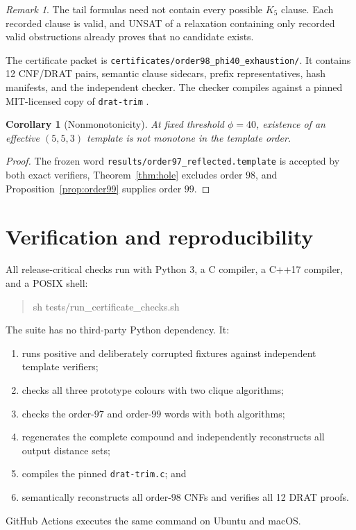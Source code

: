 \documentclass[11pt]{article}
\newtheorem{corollary}[theorem]{Corollary}
\theoremstyle{definition}
\theoremstyle{remark}
\newtheorem{remark}[theorem]{Remark}
\newcommand{\code}[1]{\texttt{#1}}
\begin{document}
\begin{remark}
The tail formulas need not contain every possible $K_5$ clause. Each recorded
clause is valid, and UNSAT of a relaxation containing only recorded valid
obstructions already proves that no candidate exists.
\end{remark}

The certificate packet is
\code{certificates/order98\_phi40\_exhaustion/}. It contains 12 CNF/DRAT
pairs, semantic clause sidecars, prefix representatives, hash manifests, and
the independent checker. The checker compiles against a pinned
MIT-licensed copy of \code{drat-trim} \cite{drat-trim}.

\begin{corollary}[Nonmonotonicity]
\label{cor:nonmonotone}
At fixed threshold $\phi=40$, existence of an effective $(5,5,3)$ template
is not monotone in the template order.
\end{corollary}

\begin{proof}
The frozen word \code{results/order97\_reflected.template} is accepted by
both exact verifiers, Theorem~\ref{thm:hole} excludes order $98$, and
Proposition~\ref{prop:order99} supplies order $99$.
\end{proof}

\section{Verification and reproducibility}

All release-critical checks run with Python 3, a C compiler, a C++17
compiler, and a POSIX shell:
\begin{quote}
\ttfamily\small
sh tests/run\_certificate\_checks.sh
\end{quote}
The suite has no third-party Python dependency. It:
\begin{enumerate}
  \item runs positive and deliberately corrupted fixtures against independent
  template verifiers;
  \item checks all three prototype colours with two clique algorithms;
  \item checks the order-$97$ and order-$99$ words with both algorithms;
  \item regenerates the complete compound and independently reconstructs all
  output distance sets;
  \item compiles the pinned \code{drat-trim.c}; and
  \item semantically reconstructs all order-$98$ CNFs and verifies all 12
  DRAT proofs.
\end{enumerate}
GitHub Actions executes the same command on Ubuntu and macOS.
\end{document}
